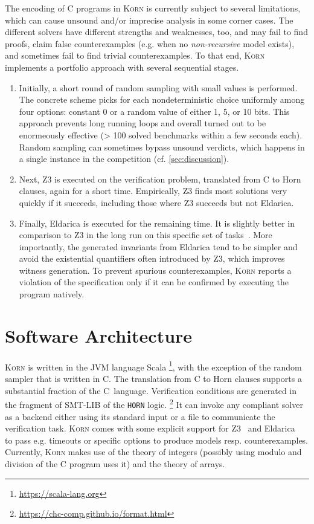 \documentclass{llncs}
\newcommand{\Korn}{\textsc{Korn}\xspace}
\begin{document}
The encoding of C programs in \Korn is currently subject to several limitations,
which can cause unsound and/or imprecise analysis in some corner cases.
The different solvers have different strengths and weaknesses, too,
and may fail to find proofs, claim false counterexamples (e.g. when no \emph{non-recursive} model exists),
and sometimes fail to find trivial counterexamples.
To that end, \Korn implements a portfolio approach with several sequential stages.
\begin{enumerate}
    \item Initially, a short round of random sampling with small values is performed.
          The concrete scheme picks for each nondeterministic choice
          uniformly among four options: constant 0 or a random value of either 1, 5, or 10 bits.
          This approach prevents long running loops and overall turned out to be enormeously effective
          (> 100 solved benchmarks within a few seconds each).
          Random sampling can sometimes bypass unsound verdicts,
          which happens in a single instance in the competition (cf. \cref{sec:discussion}).
    \item Next, Z3 is executed on the verification problem, translated from C to Horn clauses,
          again for a short time. Empirically, Z3 finds most solutions very quickly if it succeeds,
          including those where Z3 succeeds but not Eldarica.
    \item Finally, Eldarica is executed for the remaining time.
          It is slightly better in comparison to Z3 in the long run on this specific set of tasks~\cite{ernst:arxiv2020:summaries}.
    More importantly, the generated invariants from Eldarica tend to be simpler and avoid the existential quantifiers
    often introduced by Z3, which improves witness generation.
    To prevent spurious counterexamples,
    \Korn reports a violation of the specification only if it can be confirmed by executing the program natively.
\end{enumerate}


\section{Software Architecture}
\label{sec:architecture}

\Korn is written in the JVM language Scala%
    \footnote{\url{https://scala-lang.org}}, with the exception of the random sampler that is written in C.
The translation from C to Horn clauses supports a substantial fraction of the C~language.
Verification conditions are generated in the fragment of SMT-LIB of the \texttt{HORN} logic.%
    \footnote{\url{https://chc-comp.github.io/format.html}}
It can invoke any compliant solver as a backend either using its standard input or a file to communicate the verification task.
\Korn comes with some explicit support for Z3~\cite{gurfinkel2019science} and Eldarica~\cite{hojjat2018eldarica}
to pass e.g. timeouts or specific options to produce models resp. counterexamples.
Currently, \Korn makes use of the theory of integers (possibly using modulo and division of the C program uses it) and the theory of arrays.
\end{document}
